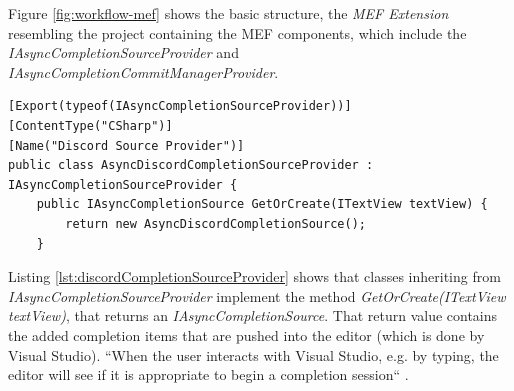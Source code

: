 Figure \ref{fig:workflow-mef} shows the basic structure, the \textit{MEF Extension} resembling the project containing the MEF components, which include the \textit{IAsyncCompletionSourceProvider} and \textit{IAsyncCompletionCommitManagerProvider}.

\begin{lstlisting}[style=CSharp, caption={Discord Completion Source Provider}, label={lst:discordCompletionSourceProvider}]
[Export(typeof(IAsyncCompletionSourceProvider))]
[ContentType("CSharp")]
[Name("Discord Source Provider")]
public class AsyncDiscordCompletionSourceProvider : IAsyncCompletionSourceProvider {
	public IAsyncCompletionSource GetOrCreate(ITextView textView) {
		return new AsyncDiscordCompletionSource();
	}
\end{lstlisting}
Listing \ref{lst:discordCompletionSourceProvider} shows that classes inheriting from \textit{IAsyncCompletionSourceProvider} implement the method \textit{GetOrCreate(ITextView textView)}, that returns an \textit{IAsyncCompletionSource}. That return value contains the added completion items that are pushed into the editor (which is done by Visual Studio). ``When the user interacts with Visual Studio, e.g. by typing, the editor will see if it is appropriate to begin a completion session`` \citep{asynccompletionapiissue}.

